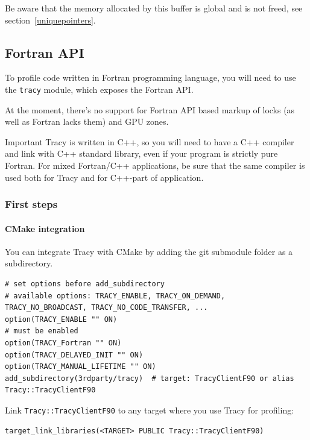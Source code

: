 \documentclass[hidelinks,titlepage,a4paper,twoside]{article}
\begin{document}
Be aware that the memory allocated by this buffer is global and is not freed, see section~\ref{uniquepointers}.

\subsection{Fortran API}
\label{fortranapi}

To profile code written in Fortran programming language, you will need to use the \texttt{tracy} module, which exposes the Fortran API.

At the moment, there's no support for Fortran API based markup of locks (as well as Fortran lacks them) and GPU zones.

\begin{bclogo}[
noborder=true,
couleur=black!5,
logo=\bcbombe
]{Important}
Tracy is written in C++, so you will need to have a C++ compiler and link with C++ standard library, even if your program is strictly pure Fortran.
For mixed Fortran/C++ applications, be sure that the same compiler is used both for Tracy and for C++-part of application.
\end{bclogo}

\subsubsection{First steps}

\paragraph{CMake integration}

You can integrate Tracy with CMake by adding the git submodule folder as a subdirectory.

\begin{lstlisting}
# set options before add_subdirectory
# available options: TRACY_ENABLE, TRACY_ON_DEMAND, TRACY_NO_BROADCAST, TRACY_NO_CODE_TRANSFER, ...
option(TRACY_ENABLE "" ON)
# must be enabled
option(TRACY_Fortran "" ON)
option(TRACY_DELAYED_INIT "" ON)
option(TRACY_MANUAL_LIFETIME "" ON)
add_subdirectory(3rdparty/tracy)  # target: TracyClientF90 or alias Tracy::TracyClientF90
\end{lstlisting}

Link \texttt{Tracy::TracyClientF90} to any target where you use Tracy for profiling:

\begin{lstlisting}
target_link_libraries(<TARGET> PUBLIC Tracy::TracyClientF90)
\end{lstlisting}
\end{document}

